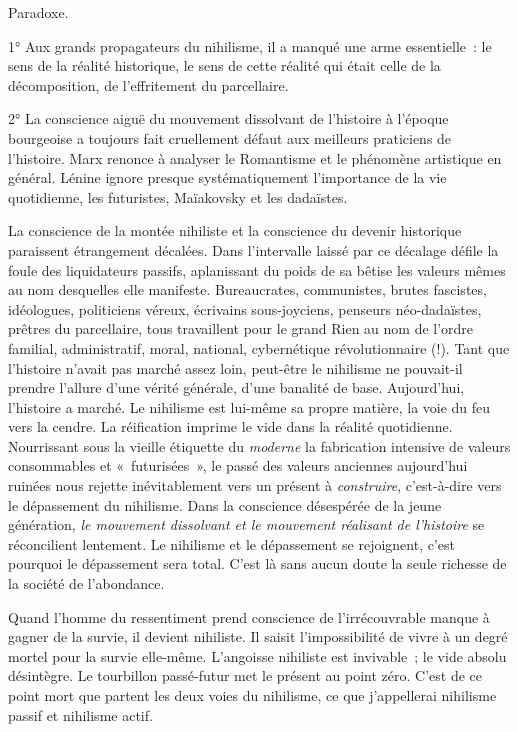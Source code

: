 \documentclass[french,twoside]{book} %
\begin{document}
Paradoxe.\par
1° Aux grands propagateurs du nihilisme, il a manqué une arme essentielle : le sens de la réalité historique, le sens de cette réalité qui était celle de la décomposition, de l’effritement du parcellaire.\par
2° La conscience aiguë du mouvement dissolvant de l’histoire à l’époque bourgeoise a toujours fait cruellement défaut aux meilleurs praticiens de l’histoire. Marx renonce à analyser le Romantisme et le phénomène artistique en général. Lénine ignore presque systématiquement l’importance de la vie quotidienne, les futuristes, Maïakovsky et les dadaïstes.\par
La conscience de la montée nihiliste et la conscience du devenir historique paraissent étrangement décalées. Dans l’intervalle laissé par ce décalage défile la foule des liquidateurs passifs, aplanissant du poids de sa bêtise les valeurs mêmes au nom desquelles elle manifeste. Bureaucrates, communistes, brutes fascistes, idéologues, politiciens véreux, écrivains sous-joyciens, penseurs néo-dadaïstes, prêtres du parcellaire, tous travaillent pour le grand Rien au nom de l’ordre familial, administratif, moral, national, cybernétique révolutionnaire (!). Tant que l’histoire n’avait pas marché assez loin, peut-être le nihilisme ne pouvait-il prendre l’allure d’une vérité générale, d’une banalité de base. Aujourd’hui, l’histoire a marché. Le nihilisme est lui-même sa propre matière, la voie du feu vers la cendre. La réification imprime le vide dans la réalité quotidienne. Nourrissant sous la vieille étiquette du \emph{moderne} la fabrication intensive de valeurs consommables et « futurisées », le passé des valeurs anciennes aujourd’hui ruinées nous rejette inévitablement vers un présent à \emph{construire}, c’est-à-dire vers le dépassement du nihilisme. Dans la conscience désespérée de la jeune génération, \emph{le mouvement dissolvant et le mouvement réalisant de l’histoire} se réconcilient lentement. Le nihilisme et le dépassement se rejoignent, c’est pourquoi le dépassement sera total. C’est là sans aucun doute la seule richesse de la société de l’abondance.\par
Quand l’homme du ressentiment prend conscience de l’irrécouvrable manque à gagner de la survie, il devient nihiliste. Il saisit l’impossibilité de vivre à un degré mortel pour la survie elle-même. L’angoisse nihiliste est invivable ; le vide absolu désintègre. Le tourbillon passé-futur met le présent au point zéro. C’est de ce point mort que partent les deux voies du nihilisme, ce que j’appellerai nihilisme passif et nihilisme actif.\par
\end{document}
